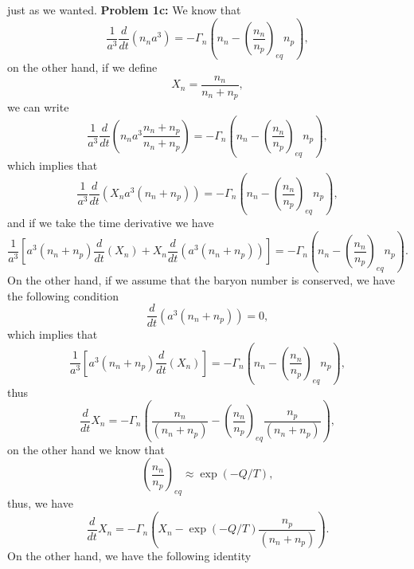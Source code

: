 \documentclass[11pt]{article}
\begin{document}
just as we wanted.
\newline
\textbf{Problem 1c:}
We know that 
\begin{displaymath}
  \frac{1}{a^3}\frac{d}{dt}(n_n a^3) = -\Gamma_n \left( n_n - \left(\frac{n_n}{n_p}\right)_{eq} n_p\right),
\end{displaymath}
on the other hand, if we define 
\begin{displaymath}
  X_n = \frac{n_n}{n_n + n_p},
\end{displaymath}
we can write
\begin{displaymath}
  \frac{1}{a^3}\frac{d}{dt}(n_n a^3 \frac{n_n + n_p}{n_n + n_p}) = -\Gamma_n \left( n_n - \left(\frac{n_n}{n_p}\right)_{eq} n_p\right),
\end{displaymath}
which implies that
\begin{displaymath}
  \frac{1}{a^3}\frac{d}{dt}(X_n a^3 (n_n + n_p)) = -\Gamma_n \left( n_n - \left(\frac{n_n}{n_p}\right)_{eq} n_p\right),  
\end{displaymath}
and if we take the time derivative we have
\begin{displaymath}
  \frac{1}{a^3}\left[a^3 (n_n + n_p)\frac{d}{dt}(X_n) + X_n\frac{d}{dt}(a^3 (n_n + n_p))\right] = -\Gamma_n \left( n_n - \left(\frac{n_n}{n_p}\right)_{eq} n_p\right).  
\end{displaymath}
On the other hand, if we assume that the baryon number is conserved, we have the following condition
\begin{displaymath}
  \frac{d}{dt}(a^3 (n_n + n_p))=0,
\end{displaymath}
which implies that
\begin{displaymath}
  \frac{1}{a^3}\left[a^3 (n_n + n_p)\frac{d}{dt}(X_n) \right] = -\Gamma_n \left( n_n - \left(\frac{n_n}{n_p}\right)_{eq} n_p\right),  
\end{displaymath}
thus
\begin{displaymath}
\frac{d}{dt} X_n = -\Gamma_n \left( \frac{n_n}{(n_n + n_p)} - \left(\frac{n_n}{n_p}\right)_{eq} \frac{n_p}{(n_n + n_p)}\right),  
\end{displaymath}
on the other hand we know that 
\begin{displaymath}
  \left(\frac{n_n}{n_p}\right)_{eq} \approx \exp(-Q/T),
\end{displaymath}
thus, we have
\begin{displaymath}
\frac{d}{dt} X_n = -\Gamma_n \left( X_n - \exp(-Q/T) \frac{n_p}{(n_n + n_p)}\right).
\end{displaymath}
On the other hand, we have the following identity
\end{document}
